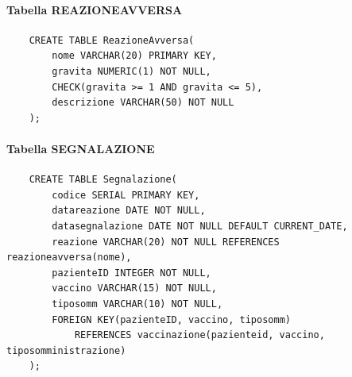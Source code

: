 \documentclass{article}
\begin{document}
\paragraph*{Tabella REAZIONEAVVERSA}
\begin{verbatim}
    CREATE TABLE ReazioneAvversa(
        nome VARCHAR(20) PRIMARY KEY,
        gravita NUMERIC(1) NOT NULL,
        CHECK(gravita >= 1 AND gravita <= 5),
        descrizione VARCHAR(50) NOT NULL
    );
\end{verbatim}
\paragraph*{Tabella SEGNALAZIONE}
\begin{verbatim}
    CREATE TABLE Segnalazione(
        codice SERIAL PRIMARY KEY,
        datareazione DATE NOT NULL,
        datasegnalazione DATE NOT NULL DEFAULT CURRENT_DATE,
        reazione VARCHAR(20) NOT NULL REFERENCES reazioneavversa(nome),
        pazienteID INTEGER NOT NULL,
        vaccino VARCHAR(15) NOT NULL,
        tiposomm VARCHAR(10) NOT NULL,
        FOREIGN KEY(pazienteID, vaccino, tiposomm) 
            REFERENCES vaccinazione(pazienteid, vaccino, tiposomministrazione)
    );
\end{verbatim}
\end{document}
